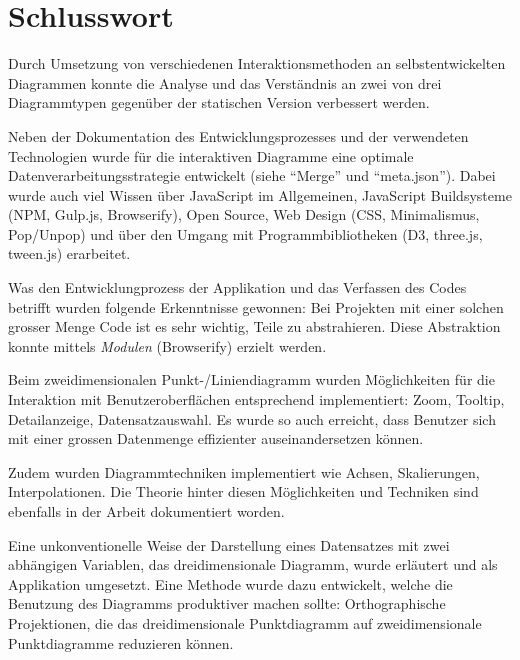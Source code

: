 \chapter{Schlusswort}

Durch Umsetzung von verschiedenen Interaktionsmethoden an selbstentwickelten Diagrammen konnte die Analyse und das Verständnis an zwei von drei Diagrammtypen gegenüber der statischen Version verbessert werden.

Neben der Dokumentation des Entwicklungsprozesses und der verwendeten Technologien wurde für die interaktiven Diagramme eine optimale Datenverarbeitungsstrategie entwickelt (siehe "`Merge"' und "`meta.json"'). Dabei wurde auch viel Wissen über JavaScript im Allgemeinen, JavaScript Buildsysteme (NPM, Gulp.js, Browserify), Open Source, Web Design (CSS, Minimalismus, Pop/Unpop) und über den Umgang mit Programmbibliotheken (D3, three.js, tween.js) erarbeitet.

Was den Entwicklungprozess der Applikation und das Verfassen des Codes betrifft wurden folgende Erkenntnisse gewonnen: Bei Projekten mit einer solchen grosser Menge Code ist es sehr wichtig, Teile zu abstrahieren. Diese Abstraktion konnte mittels \textit{Modulen} (Browserify) erzielt werden.

Beim zweidimensionalen Punkt-/Liniendiagramm wurden Möglichkeiten für die Interaktion mit Benutzeroberflächen entsprechend implementiert: Zoom, Tooltip, Detailanzeige, Datensatzauswahl. Es wurde so auch erreicht, dass Benutzer sich mit einer grossen Datenmenge effizienter auseinandersetzen können. 

Zudem wurden Diagrammtechniken implementiert wie Achsen, Skalierungen, Interpolationen. Die Theorie hinter diesen Möglichkeiten und Techniken sind ebenfalls in der Arbeit dokumentiert worden.

Eine unkonventionelle Weise der Darstellung eines Datensatzes mit zwei abhängigen Variablen, das dreidimensionale Diagramm, wurde erläutert und als Applikation umgesetzt. Eine Methode wurde dazu entwickelt, welche die Benutzung des Diagramms produktiver machen sollte: Orthographische Projektionen, die das dreidimensionale Punktdiagramm auf zweidimensionale Punktdiagramme reduzieren können.
